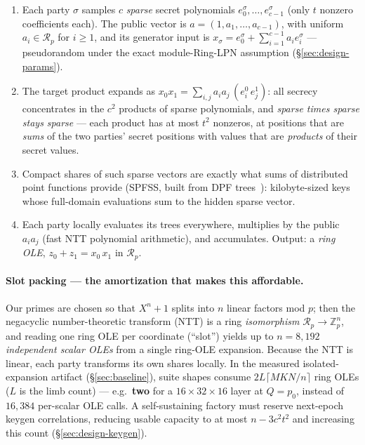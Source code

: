 \documentclass[11pt]{article}
\newcommand{\Z}{\mathbb{Z}}
\newcommand{\Ring}{\mathcal{R}}
\newcommand{\Q}{Q}   %
\begin{document}
\begin{enumerate}
\item Each party $\sigma$ samples $c$ \emph{sparse} secret polynomials
  $e^{\sigma}_0,\dots,e^{\sigma}_{c-1}$ (only $t$ nonzero coefficients each).
  The public vector is
  $a=(1,a_1,\ldots,a_{c-1})$, with uniform $a_i\in\Ring_p$ for $i\geq1$, and
  its generator input is
  $x_\sigma=e^\sigma_0+\sum_{i=1}^{c-1}a_i e^\sigma_i$ --- pseudorandom under
  the exact module-Ring-LPN assumption (\S\ref{sec:design-params}).
\item The target product expands as
  $x_0 x_1 = \sum_{i,j} a_i a_j\,(e^0_i\, e^1_j)$: all secrecy concentrates in
  the $c^2$ products of sparse polynomials, and \emph{sparse times sparse
  stays sparse} --- each product has at most $t^2$ nonzeros, at positions that
  are \emph{sums} of the two parties' secret positions with values that are
  \emph{products} of their secret values.
\item Compact shares of such sparse vectors are exactly what sums of
  distributed point functions provide (SPFSS, built from DPF
  trees~\cite{boyle2015fss}): kilobyte-sized keys whose full-domain
  evaluations sum to the hidden sparse vector.
\item Each party locally evaluates its trees everywhere, multiplies by the
  public $a_i a_j$ (fast NTT polynomial arithmetic), and accumulates. Output:
  a \emph{ring OLE}, $z_0 + z_1 = x_0\, x_1$ in $\Ring_p$.
\end{enumerate}

\paragraph{Slot packing --- the amortization that makes this affordable.}
Our primes are chosen so that $X^n+1$ splits into $n$ linear factors mod $p$;
then the negacyclic number-theoretic transform (NTT) is a ring
\emph{isomorphism} $\Ring_p \to \Z_p^n$, and reading one ring OLE per
coordinate (``slot'') yields up to $n = 8{,}192$ \emph{independent scalar
OLEs} from a single ring-OLE expansion. Because the NTT is linear, each party
transforms its own shares locally. In the measured isolated-expansion artifact
(\S\ref{sec:baseline}), suite shapes consume
$2L\lceil MKN/n\rceil$ ring OLEs ($L$ is the limb count) --- e.g.\
\textbf{two} for a $16{\times}32{\times}16$ layer at $\Q=p_0$, instead of
$16{,}384$ per-scalar OLE calls. A self-sustaining factory must reserve
next-epoch keygen correlations, reducing usable capacity to at most
$n-3c^2t^2$ and increasing this count (\S\ref{sec:design-keygen}).
\end{document}
